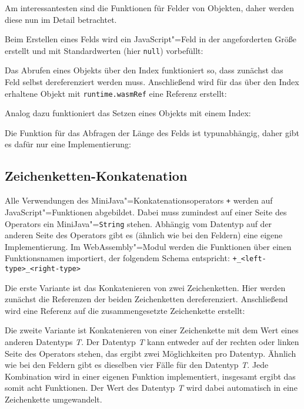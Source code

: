 Am interessantesten sind die Funktionen für Felder von Objekten, daher werden diese nun im Detail betrachtet.

Beim Erstellen eines Felds wird ein JavaScript"=Feld in der angeforderten Größe erstellt und mit Standardwerten (hier \lstinline{null}) vorbefüllt:


Das Abrufen eines Objekts über den Index funktioniert so, dass zunächst das Feld selbst dereferenziert werden muss. Anschließend wird für das über den Index erhaltene Objekt mit \lstinline{runtime.wasmRef} eine Referenz erstellt:


Analog dazu funktioniert das Setzen eines Objekts mit einem Index:


Die Funktion für das Abfragen der Länge des Felds ist typunabhängig, daher gibt es dafür nur eine Implementierung:



\subsection{Zeichenketten-Konkatenation}
\label{subsec:JavaScript-Zeichenketten-Konkatenation}

Alle Verwendungen des MiniJava"=Konkatenationsoperators \lstinline{+} werden auf JavaScript"=Funktionen abgebildet. Dabei muss zumindest auf einer Seite des Operators ein MiniJava"=\lstinline{String} stehen. Abhängig vom Datentyp auf der anderen Seite des Operators gibt es (ähnlich wie bei den Feldern) eine eigene Implementierung. Im WebAssembly"=Modul werden die Funktionen über einen Funktionsnamen importiert, der folgendem Schema entspricht: \lstinline{+_<left-type>_<right-type>}

Die erste Variante ist das Konkatenieren von zwei Zeichenketten. Hier werden zunächst die Referenzen der beiden Zeichenketten dereferenziert. Anschließend wird eine Referenz auf die zusammengesetzte Zeichenkette erstellt:


Die zweite Variante ist Konkatenieren von einer Zeichenkette mit dem Wert eines anderen Datentyps \emph{T}. Der Datentyp \emph{T} kann entweder auf der rechten oder linken Seite des Operators stehen, das ergibt zwei Möglichkeiten pro Datentyp. Ähnlich wie bei den Feldern gibt es dieselben vier Fälle für den Datentyp \emph{T}. Jede Kombination wird in einer eigenen Funktion implementiert, insgesamt ergibt das somit acht Funktionen. Der Wert des Datentyp \emph{T} wird dabei automatisch in eine Zeichenkette umgewandelt.

